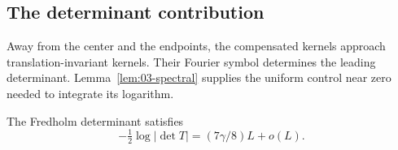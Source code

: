 \subsection{The determinant contribution}

Away from the center and the endpoints, the compensated kernels
approach translation-invariant kernels. Their Fourier symbol determines
the leading determinant. Lemma~\ref{lem:03-spectral} supplies the
uniform control near zero needed to integrate its logarithm.

\begin{theorem}\label{thm:03-determinant}\label{E:determinant}
The Fredholm determinant satisfies
\begin{equation}
 -\tfrac12\log|\det T|=(7\gamma/8)L+o(L).
 \label{eq:G-9}
\end{equation}
\end{theorem}
